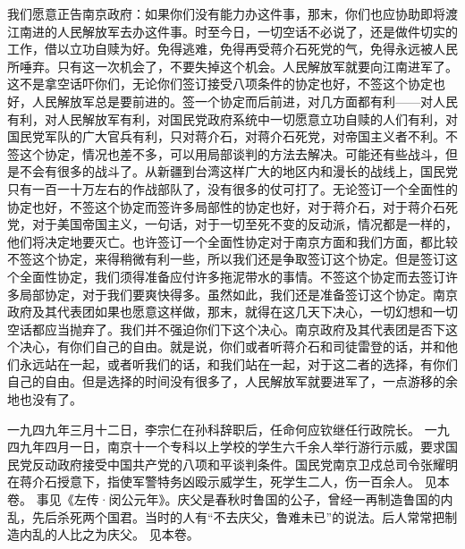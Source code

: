 我们愿意正告南京政府：如果你们没有能力办这件事，那末，你们也应协助即将渡江南进的人民解放军去办这件事。时至今日，一切空话不必说了，还是做件切实的工作，借以立功自赎为好。免得逃难，免得再受蒋介石死党的气，免得永远被人民所唾弃。只有这一次机会了，不要失掉这个机会。人民解放军就要向江南进军了。这不是拿空话吓你们，无论你们签订接受八项条件的协定也好，不签这个协定也好，人民解放军总是要前进的。签一个协定而后前进，对几方面都有利——对人民有利，对人民解放军有利，对国民党政府系统中一切愿意立功自赎的人们有利，对国民党军队的广大官兵有利，只对蒋介石，对蒋介石死党，对帝国主义者不利。不签这个协定，情况也差不多，可以用局部谈判的方法去解决。可能还有些战斗，但是不会有很多的战斗了。从新疆到台湾这样广大的地区内和漫长的战线上，国民党只有一百一十万左右的作战部队了，没有很多的仗可打了。无论签订一个全面性的协定也好，不签这个协定而签许多局部性的协定也好，对于蒋介石，对于蒋介石死党，对于美国帝国主义，一句话，对于一切至死不变的反动派，情况都是一样的，他们将决定地要灭亡。也许签订一个全面性协定对于南京方面和我们方面，都比较不签这个协定，来得稍微有利一些，所以我们还是争取签订这个协定。但是签订这个全面性协定，我们须得准备应付许多拖泥带水的事情。不签这个协定而去签订许多局部协定，对于我们要爽快得多。虽然如此，我们还是准备签订这个协定。南京政府及其代表团如果也愿意这样做，那末，就得在这几天下决心，一切幻想和一切空话都应当抛弃了。我们并不强迫你们下这个决心。南京政府及其代表团是否下这个决心，有你们自己的自由。就是说，你们或者听蒋介石和司徒雷登的话，并和他们永远站在一起，或者听我们的话，和我们站在一起，对于这二者的选择，有你们自己的自由。但是选择的时间没有很多了，人民解放军就要进军了，一点游移的余地也没有了。


\begin{maonote}
一九四九年三月十二日，李宗仁在孙科辞职后，任命何应钦继任行政院长。
一九四九年四月一日，南京十一个专科以上学校的学生六千余人举行游行示威，要求国民党反动政府接受中国共产党的八项和平谈判条件。国民党南京卫戍总司令张耀明在蒋介石授意下，指使军警特务凶殴示威学生，死学生二人，伤一百余人。
见本卷。
事见《左传·闵公元年》。庆父是春秋时鲁国的公子，曾经一再制造鲁国的内乱，先后杀死两个国君。当时的人有“不去庆父，鲁难未已”的说法。后人常常把制造内乱的人比之为庆父。
见本卷。
\end{maonote}
